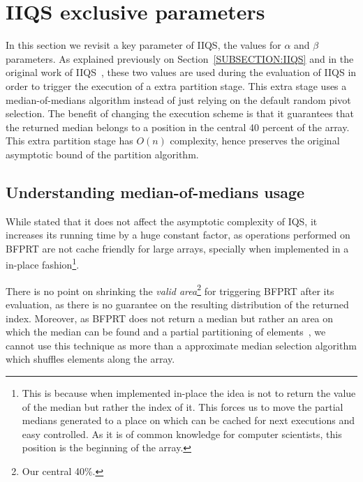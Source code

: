 \section{IIQS exclusive parameters}
\label{SECTION:IQS_PARAMS}
In this section we revisit a key parameter of IIQS, the values for $\alpha$ and $\beta$ parameters. As explained previously on Section~\ref{SUBSECTION:IIQS} and in the original work of IIQS~\cite{7416566}, these two values are used during the evaluation of IIQS in order to trigger the execution of a extra partition stage. This extra stage uses a median-of-medians algorithm instead of just relying on the default random pivot selection. The benefit of changing the execution scheme is that it guarantees that the returned median belongs to a position in the central 40 percent of the array.  This extra partition stage has $O(n)$ complexity, hence preserves the original asymptotic bound of the partition algorithm.

\subsection{Understanding median-of-medians usage}
While stated that it does not affect the asymptotic complexity of IQS, it increases its running time by a huge constant factor, as operations performed on BFPRT are not cache friendly for large arrays, specially when implemented in a in-place fashion\footnote{This is because when implemented in-place the idea is not to return the value of the median but rather the index of it. This forces us to move the partial medians generated to a place on which can be cached for next executions and easy controlled. As it is of common knowledge for computer scientists, this position is the beginning of the array.}. 

There is no point on shrinking the \emph{valid area}\footnote{Our central 40\%.} for triggering BFPRT after its evaluation, as there is no guarantee on the resulting distribution of the returned index. Moreover, as BFPRT does not return a median but rather an area on which the median can be found and a partial partitioning of elements~\cite{Blum_Floyd_Pratt_Rivest_Tarjan_1973}, we cannot use this technique as more than a approximate median selection algorithm which shuffles elements along the array.


